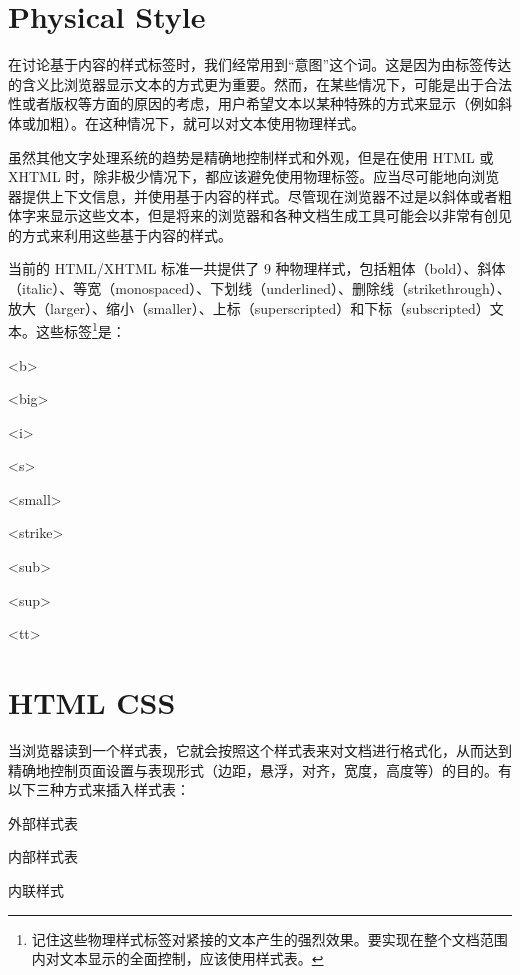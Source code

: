 \chapter{Physical Style}


在讨论基于内容的样式标签时，我们经常用到“意图”这个词。这是因为由标签传达的含义比浏览器显示文本的方式更为重要。然而，在某些情况下，可能是出于合法性或者版权等方面的原因的考虑，用户希望文本以某种特殊的方式来显示（例如斜体或加粗）。在这种情况下，就可以对文本使用物理样式。

虽然其他文字处理系统的趋势是精确地控制样式和外观，但是在使用 HTML 或 XHTML 时，除非极少情况下，都应该避免使用物理标签。应当尽可能地向浏览器提供上下文信息，并使用基于内容的样式。尽管现在浏览器不过是以斜体或者粗体字来显示这些文本，但是将来的浏览器和各种文档生成工具可能会以非常有创见的方式来利用这些基于内容的样式。


当前的 HTML/XHTML 标准一共提供了 9 种物理样式，包括粗体（bold）、斜体（italic）、等宽（monospaced）、下划线（underlined）、删除线（strikethrough）、放大（larger）、缩小（smaller）、上标（superscripted）和下标（subscripted）文本。这些标签\footnote{记住这些物理样式标签对紧接的文本产生的强烈效果。要实现在整个文档范围内对文本显示的全面控制，应该使用样式表。}是：

\begin{compactitem}
\item <b>
\item <big>
\item <i>
\item <s>
\item <small>
\item <strike>
\item <sub>
\item <sup>
\item <tt>
\end{compactitem}

\chapter{HTML CSS}

当浏览器读到一个样式表，它就会按照这个样式表来对文档进行格式化，从而达到精确地控制页面设置与表现形式（边距，悬浮，对齐，宽度，高度等）的目的。有以下三种方式来插入样式表：

\begin{compactitem}
\item 外部样式表
\item 内部样式表
\item 内联样式
\end{compactitem}

